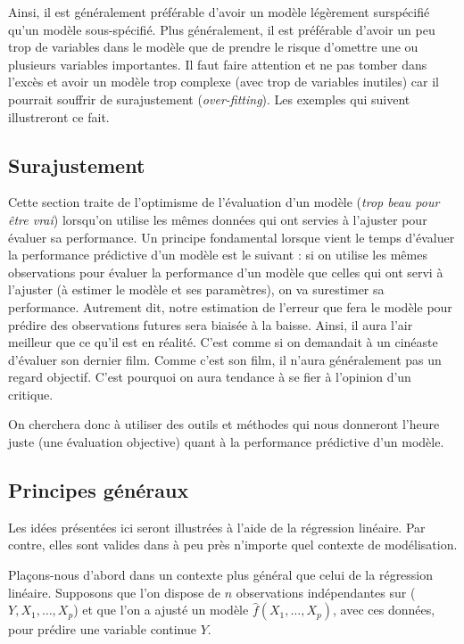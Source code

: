 \documentclass[
  11pt,
  letterpaper,
]{scrbook}
\theoremstyle{definition}
\theoremstyle{remark}
\begin{document}
Ainsi, il est généralement préférable d'avoir un modèle légèrement
surspécifié qu'un modèle sous-spécifié. Plus généralement, il est
préférable d'avoir un peu trop de variables dans le modèle que de
prendre le risque d'omettre une ou plusieurs variables importantes. Il
faut faire attention et ne pas tomber dans l'excès et avoir un modèle
trop complexe (avec trop de variables inutiles) car il pourrait souffrir
de surajustement (\emph{over-fitting}). Les exemples qui suivent
illustreront ce fait.

\subsection{Surajustement}\label{surajustement}

Cette section traite de l'optimisme de l'évaluation d'un modèle
(\emph{trop beau pour être vrai}) lorsqu'on utilise les mêmes données
qui ont servies à l'ajuster pour évaluer sa performance. Un principe
fondamental lorsque vient le temps d'évaluer la performance prédictive
d'un modèle est le suivant : si on utilise les mêmes observations pour
évaluer la performance d'un modèle que celles qui ont servi à l'ajuster
(à estimer le modèle et ses paramètres), on va surestimer sa
performance. Autrement dit, notre estimation de l'erreur que fera le
modèle pour prédire des observations futures sera biaisée à la baisse.
Ainsi, il aura l'air meilleur que ce qu'il est en réalité. C'est comme
si on demandait à un cinéaste d'évaluer son dernier film. Comme c'est
son film, il n'aura généralement pas un regard objectif. C'est pourquoi
on aura tendance à se fier à l'opinion d'un critique.

On cherchera donc à utiliser des outils et méthodes qui nous donneront
l'heure juste (une évaluation objective) quant à la performance
prédictive d'un modèle.

\subsection{Principes généraux}\label{principes-guxe9nuxe9raux}

Les idées présentées ici seront illustrées à l'aide de la régression
linéaire. Par contre, elles sont valides dans à peu près n'importe quel
contexte de modélisation.

Plaçons-nous d'abord dans un contexte plus général que celui de la
régression linéaire. Supposons que l'on dispose de \(n\) observations
indépendantes sur (\(Y, X_1, \ldots, X_p\)) et que l'on a ajusté un
modèle \(\widehat{f}(X_1, \ldots, X_p)\), avec ces données, pour prédire
une variable continue \(Y\).
\end{document}
